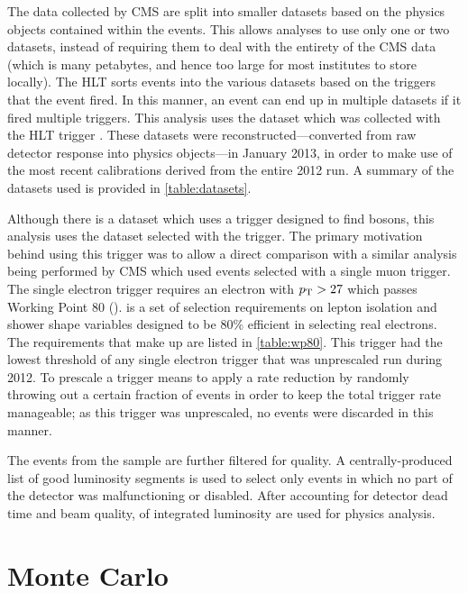 The data collected by CMS are split into smaller datasets based on the physics
objects contained within the events. This allows analyses to use only one or
two datasets, instead of requiring them to deal with the entirety of the CMS
data (which is many petabytes, and hence too large for most institutes to store
locally). The HLT sorts events into the various datasets based on the triggers
that the event fired. In this manner, an event can end up in multiple datasets
if it fired multiple triggers. This analysis uses the \SingleElectron dataset
which was collected with the HLT trigger \SingleElectronTrigger. These datasets
were reconstructed---converted from raw detector response into physics
objects---in January 2013, in order to make use of the most recent
calibrations derived from the entire 2012 run. A summary of the datasets used
is provided in \cref{table:datasets}.



Although there is a \DoubleElectron dataset which uses a trigger designed to
find \Z bosons, this analysis uses the \SingleElectron dataset selected with the
\SingleElectronTrigger trigger. The primary motivation behind using this
trigger was to allow a direct comparison with a similar \phistar analysis being
performed by CMS which used \Ztomumu events selected with a single muon
trigger. The single electron trigger requires an electron with $p_{\mathrm{T}} > 27$ which
passes Working Point 80 (\WPEighty). \WPEighty is a set of selection
requirements on lepton isolation and shower shape variables designed to be 80\%
efficient in selecting real electrons. The requirements that make up \WPEighty
are listed in \cref{table:wp80}. This trigger had the lowest \pt threshold
of any single electron trigger that was unprescaled run during 2012. To
prescale a trigger means to apply a rate reduction by randomly throwing out a
certain fraction of events in order to keep the total trigger rate manageable;
as this trigger was unprescaled, no events were discarded in this manner.



The events from the \SingleElectron sample are further filtered for quality. A
centrally-produced list of good luminosity segments is used to select only
events in which no part of the detector was malfunctioning or disabled. After
accounting for detector dead time and beam quality, \GoodLumiNumber of
integrated luminosity are used for physics analysis.

\section{Monte Carlo}
\label{sec:mc}

